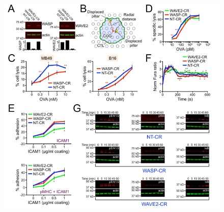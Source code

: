 \begin{figure}[h!]
	\ContinuedFloat
    \centering
    \captionsetup{labelformat=adja-page}
    \includegraphics[width=\textwidth]{../figures/chapter2/fig6supp.png}
    \caption[]{}
\end{figure}

